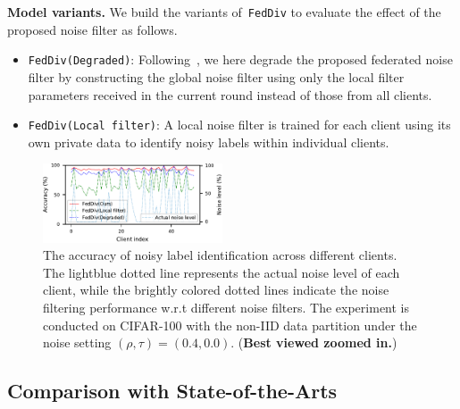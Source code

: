 \documentclass[letterpaper]{article} %
\begin{document}
\noindent
\textbf{Model variants.}
We build the variants of~\texttt{FedDiv} to evaluate the effect of the proposed noise filter as follows.

\begin{itemize}
    
    \item \texttt{FedDiv(Degraded)}: Following~\cite{fedgmm2022}, we here degrade the proposed federated noise filter by constructing the global noise filter using only the local filter parameters received in the current round instead of those from all clients.
    
    \item \texttt{FedDiv(Local filter)}: A local noise filter is trained for each client using its own private data to identify noisy labels within individual clients.

\end{itemize}
 
\begin{figure}[t]
    \centering

    \includegraphics[width=0.475\textwidth]{figures/filtering_accuracy.pdf}
    
    \caption{The accuracy of noisy label identification across different clients. The lightblue dotted line represents the actual noise level of each client, while the brightly colored dotted lines indicate the noise filtering performance w.r.t different noise filters. The experiment is conducted on CIFAR-100 with the non-IID data partition under the noise setting $(\rho, \tau)=(0.4, 0.0)$. (\textbf{Best viewed zoomed in.})} 
    \label{Figure:Filtering-Accuracy-per-Method}
    
\end{figure}

\subsection{Comparison with State-of-the-Arts}
\end{document}
